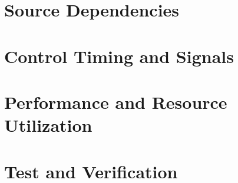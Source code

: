 \section*{Source Dependencies}

\begin{landscape}



\end{landscape}

\section*{Control Timing and Signals}
\begin{flushleft}
\end{flushleft}

\section*{Performance and Resource Utilization}

\section*{Test and Verification}
\begin{flushleft}
\end{flushleft}
